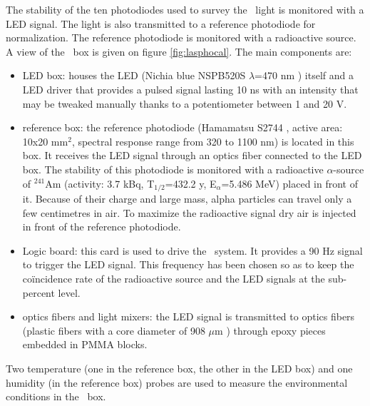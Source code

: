 The stability of the ten photodiodes used to survey the \laser~light is monitored with a LED signal. The light is also transmitted to a reference photodiode for normalization. The reference photodiode is monitored with a radioactive source.\\
A view of the \phocal~box is given on figure \ref{fig:lasphocal}. The main components are:
\begin{itemize}
\item LED box: houses the LED (Nichia blue NSPB520S $\lambda$=470 nm \cite{ref:led}) itself and a LED driver that provides a pulsed signal lasting 10 ns with an intensity that may be tweaked manually thanks to a potentiometer between 1 and 20 V.
\item reference box: the reference photodiode (Hamamatsu S2744 \cite{ref:bigphoto}, active area: 10x20 mm$^2$,  spectral response range from 320 to 1100 nm) is located in this box. It receives the LED signal through an optics fiber connected to the LED box. The stability of this photodiode is monitored with a radioactive $\alpha$-source of $^{241}$Am (activity: 3.7 kBq, T$_{1/2}$=432.2 y, E$_{\alpha}$=5.486 MeV) placed in front of it. Because of their charge and large mass, alpha particles can travel only a few centimetres in air. To maximize the radioactive signal dry air is injected in front of the reference photodiode.
\item Logic board: this card is used to drive the \phocal~system. It provides a 90 Hz signal to trigger the LED signal. This frequency has been chosen so as to keep the coïncidence rate of the radioactive source and the LED signals at the sub-percent level.
\item optics fibers and light mixers: the LED signal is transmitted to optics fibers (plastic fibers with a core diameter of 908 $\mu$m \cite{ref:fibers}) through epoxy pieces embedded in PMMA blocks.
\end{itemize}
Two temperature (one in the reference box, the other in the LED box) and one humidity (in the reference box) probes are used to measure the environmental conditions in the \phocal~box. 

